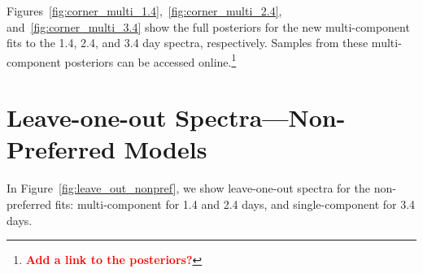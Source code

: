 \documentclass[twocolumn, twocolappendix]{aastex63}
\def\SPARK{\texttt{SPARK}}
\newcommand\redbf[1]{\textbf{\textcolor{red}{#1}}}
\begin{document}
Figures~\ref{fig:corner_multi_1.4},~\ref{fig:corner_multi_2.4}, and~\ref{fig:corner_multi_3.4} show the full posteriors for the new multi-component fits to the 1.4, 2.4, and 3.4 day spectra, respectively. Samples from these multi-component posteriors can be accessed online.\footnote{\redbf{Add a link to the posteriors?}}






\section{Leave-one-out Spectra---Non-Preferred Models}\label{app:leave_out_multi}

In Figure~\ref{fig:leave_out_nonpref}, we show leave-one-out spectra for the non-preferred fits: multi-component for 1.4 and 2.4 days, and single-component for 3.4 days.
\end{document}
